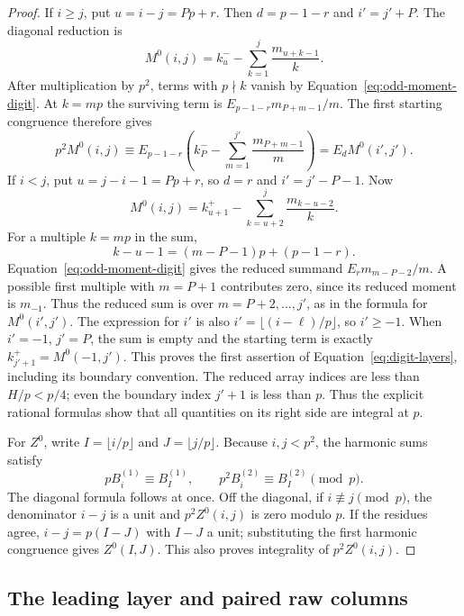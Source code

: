 \begin{proof}
If $i\ge j$, put $u=i-j=Pp+r$.  Then $d=p-1-r$ and $i'=j'+P$.
The diagonal reduction is
\[
 M^0(i,j)=k^-_u-\sum_{k=1}^{j}\frac{m_{u+k-1}}k.
\]
After multiplication by $p^2$, terms with $p\nmid k$ vanish by
Equation~\eqref{eq:odd-moment-digit}.  At $k=mp$ the surviving term is
$E_{p-1-r}m_{P+m-1}/m$.  The first starting congruence therefore gives
\[
 p^2M^0(i,j)\equiv E_{p-1-r}
       \left(k^-_P-\sum_{m=1}^{j'}\frac{m_{P+m-1}}m\right)
       =E_dM^0(i',j').
\]
If $i<j$, put $u=j-i-1=Pp+r$, so $d=r$ and $i'=j'-P-1$.  Now
\[
 M^0(i,j)=k^+_{u+1}-\sum_{k=u+2}^{j}\frac{m_{k-u-2}}k.
\]
For a multiple $k=mp$ in the sum,
\[
 k-u-1=(m-P-1)p+(p-1-r).
\]
Equation~\eqref{eq:odd-moment-digit} gives the reduced summand
$E_r m_{m-P-2}/m$.  A possible first multiple with $m=P+1$ contributes
zero, since its reduced moment is $m_{-1}$.  Thus the reduced sum is
over $m=P+2,\ldots,j'$, as in the formula for $M^0(i',j')$.
The expression for $i'$ is also
$i'=\lfloor(i-\ell)/p\rfloor$, so $i'\ge-1$.  When $i'=-1$,
$j'=P$, the sum is empty and the starting term is exactly
$k^+_{j'+1}=M^0(-1,j')$.  This proves the first assertion of
Equation~\eqref{eq:digit-layers}, including its boundary convention.
The reduced array indices are less than $H/p<p/4$; even the boundary
index $j'+1$ is less than $p$.  Thus the explicit rational formulas
show that all quantities on its right side are integral at $p$.

For $Z^0$, write $I=\lfloor i/p\rfloor$ and $J=\lfloor j/p\rfloor$.
Because $i,j<p^2$, the harmonic sums satisfy
\[
 pB_i^{(1)}\equiv B_I^{(1)},\qquad
 p^2B_i^{(2)}\equiv B_I^{(2)}\pmod p.
\]
The diagonal formula follows at once.  Off the diagonal, if
$i\not\equiv j\pmod p$, the denominator $i-j$ is a unit and
$p^2Z^0(i,j)$ is zero modulo $p$.  If the residues agree,
$i-j=p(I-J)$ with $I-J$ a unit; substituting the first harmonic
congruence gives $Z^0(I,J)$.  This also proves integrality of
$p^2Z^0(i,j)$.
\end{proof}

\subsection{The leading layer and paired raw columns}

